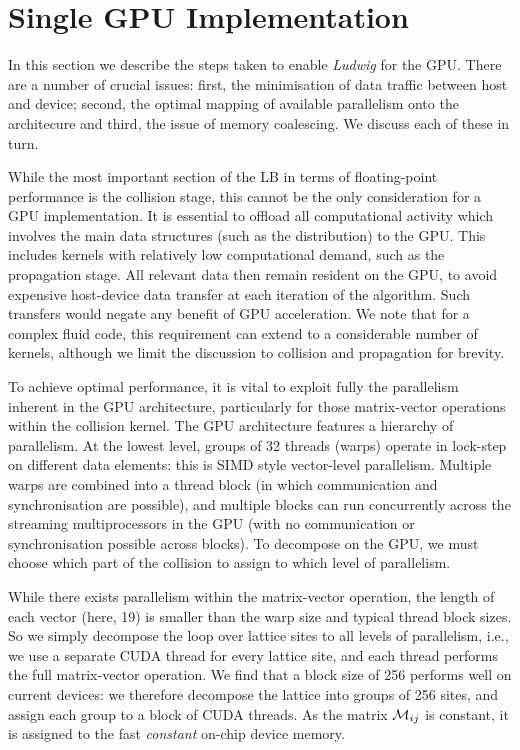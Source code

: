 \section{Single GPU Implementation}\label{ch14:sec:singlegpu}


In this section we describe the steps taken to enable \textit{Ludwig}
for the GPU. There are a number of crucial issues: first, the
minimisation of data traffic between host and device; second, the
optimal mapping of available parallelism onto the architecure and
third, the issue of memory coalescing. We discuss each of these in
turn.

While the most important section of the LB in terms of
floating-point performance is the collision stage, this cannot be the
only consideration for a GPU implementation. It is essential to
offload all computational activity which involves the main data
structures (such as the distribution) to the GPU. This includes
kernels with relatively low computational demand, such as the
propagation stage. All relevant data then remain resident on the GPU,
to avoid expensive host-device data transfer at each iteration of
the algorithm. Such transfers would negate any benefit of GPU
acceleration.  We note that for a complex fluid code, this requirement
can extend to a considerable number of kernels, although we limit the
discussion to collision and propagation for brevity.

To achieve optimal performance, it is vital to exploit fully the
parallelism inherent in the GPU architecture, particularly for
those matrix-vector operations within the collision kernel.
The GPU architecture features a hierarchy of parallelism. At the
lowest level, groups of 32 threads (warps) operate in
lock-step on different data elements: this is SIMD style vector-level
parallelism. Multiple warps are combined into a thread block (in which
communication and synchronisation are possible), and multiple blocks can
run concurrently across the streaming multiprocessors in the GPU
(with no communication or
synchronisation possible across blocks).  To decompose on the GPU, we
must choose which part of the collision to assign to which level of
parallelism.

While there exists parallelism within the matrix-vector operation, the
length of each vector (here, 19) is smaller than the warp size and typical
thread block sizes. So we simply decompose the loop over lattice sites
to all levels of parallelism, i.e., we use a separate CUDA thread for
every lattice site, and each thread performs the full matrix-vector
operation. We find that a block size of 256 performs well on current
devices: we therefore decompose
the lattice into groups of 256 sites, and assign each group to a block
of CUDA threads. As the matrix ${\cal M}_{ij}$ is constant, it is
assigned to the fast {\it constant} on-chip device memory.

